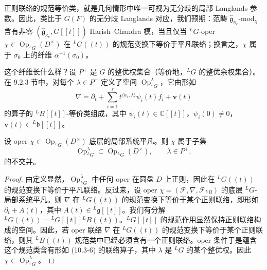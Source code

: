正则联络的规范等价类，就是几何情形中唯一可视为无分歧的局部 Langlands 参数。因此，类比于 $G(F)$ 的无分歧 Langlands 对应，我们预期：范畴 $\hat{\mathfrak{g}}_{\kappa_c}\text{-mod}_\chi$ 含有非零 $(\hat{\mathfrak{g}}_{\kappa_c},G[[t]])$ Harish--Chandra 模，当且仅当 ${}^LG$-oper $\chi\in\operatorname{Op}_{{}^LG}(D^\times)$ 在 ${}^LG((t))$ 的规范变换下等价于平凡联络；换言之，$\chi$ 属于 $\sigma_0$ 上的纤维 $\alpha^{-1}(\sigma_0)$。


这个纤维长什么样？设 $P^+$ 是 $G$ 的整优权集合（等价地，${}^LG$ 的整优余权集合）。在 9.2.3 节中，对每个 $\lambda\in P^+$ 定义了空间 $\operatorname{Op}^\lambda_{{}^LG}$，它由形如
\begin{equation}
    \nabla=\partial_t+\sum_{i=1}^{\ell}
    t^{\langle\check\alpha_i,\lambda\rangle}\psi_i(t)f_i+\mathbf{v}(t)
    \tag{10.3-6}
\end{equation}
的算子的 ${}^LB[[t]]$-等价类组成，其中 $\psi_i(t)\in\mathbb{C}[[t]]$，$\psi_i(0)\neq0$，$\mathbf{v}(t)\in{}^L\mathfrak{b}[[t]]$。

\begin{lemma}
    设 oper $\chi\in\operatorname{Op}_{{}^LG}(D^\times)$ 底层的局部系统平凡。则 $\chi$ 属于子集
    \[
        \operatorname{Op}^\lambda_{{}^LG}\subset\operatorname{Op}_{{}^LG}(D^\times),
        \qquad\lambda\in P^+,
    \]
    的不交并。
\end{lemma}

\begin{proof}
    由定义显然，$\operatorname{Op}^\lambda_{{}^LG}$ 中任何 oper 在圆盘 $D$ 上正则，因此在 ${}^LG((t))$ 的规范变换下等价于平凡联络。反过来，设 oper $\chi=(\mathcal{F},\nabla,\mathcal{F}_{{}^LB})$ 的底层 ${}^LG$-局部系统平凡。则 $\nabla$ 在 ${}^LG((t))$ 的规范变换下等价于某个正则联络，即形如 $\partial_t+A(t)$，其中 $A(t)\in{}^L\mathfrak{g}[[t]]$。我们有分解 ${}^LG((t))={}^LG[[t]]{}^LB((t))$。${}^LG[[t]]$ 的规范作用显然保持正则联络构成的空间。因此，若 oper 联络 $\nabla$ 在 ${}^LG((t))$ 的规范变换下等价于某个正则联络，则其 ${}^LB((t))$ 规范类中已经必须含有一个正则联络。oper 条件于是蕴含这个规范类含有形如 (10.3-6) 的联络算子，其中 $\lambda$ 是 ${}^LG$ 的某个整优权。因此 $\chi\in\operatorname{Op}^\lambda_{{}^LG}$。
\end{proof}


